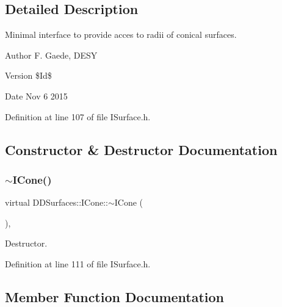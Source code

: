 \subsection{Detailed Description}
Minimal interface to provide acces to radii of conical surfaces. \begin{DoxyAuthor}{Author}
F. Gaede, D\+E\+SY 
\end{DoxyAuthor}
\begin{DoxyVersion}{Version}
\$\+Id\$ 
\end{DoxyVersion}
\begin{DoxyDate}{Date}
Nov 6 2015 
\end{DoxyDate}


Definition at line 107 of file I\+Surface.\+h.



\subsection{Constructor \& Destructor Documentation}
\hypertarget{class_d_d_surfaces_1_1_i_cone_a7693726c5c65f892a24e244b12acbf17}{}\label{class_d_d_surfaces_1_1_i_cone_a7693726c5c65f892a24e244b12acbf17} 
\subsubsection{\texorpdfstring{$\sim$\+I\+Cone()}{~ICone()}}
{\footnotesize\ttfamily virtual D\+D\+Surfaces\+::\+I\+Cone\+::$\sim$\+I\+Cone (\begin{DoxyParamCaption}{ }\end{DoxyParamCaption})\hspace{0.3cm}{\ttfamily [inline]}, {\ttfamily [virtual]}}



Destructor. 



Definition at line 111 of file I\+Surface.\+h.



\subsection{Member Function Documentation}
\hypertarget{class_d_d_surfaces_1_1_i_cone_a2543c4f2ec55d1ace4464652a0c89bce}{}\label{class_d_d_surfaces_1_1_i_cone_a2543c4f2ec55d1ace4464652a0c89bce} 
